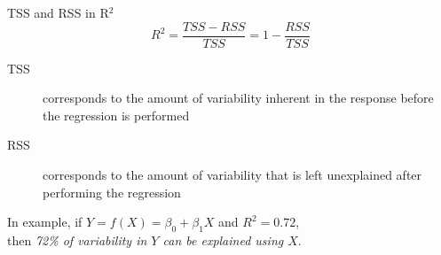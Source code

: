 \begin{frame}{TSS and RSS in R$^2$}
    \begin{equation*}
    R^2 = \frac{TSS - RSS}{TSS} = 1 - \frac{RSS}{TSS}
    \end{equation*}

    \begin{description}
        \item[TSS] corresponds to the amount of variability inherent in the response before the regression is performed
        \item[RSS] corresponds to the amount of variability that is left unexplained after performing the regression
    \end{description}

    In example, if $Y = f(X) = \beta_0 + \beta_1 X$ and $R^2 = 0.72$,\\ then \emph{72\% of variability in $Y$ can be explained using $X$}.
\end{frame}

